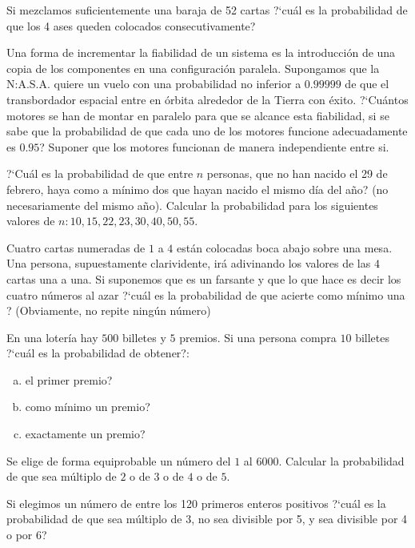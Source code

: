 \documentclass[12pt]{article}
\begin{document}
\probl  Si mezclamos   suficientemente una baraja de 52 cartas ?`cuál es la probabilidad
de que los 4 ases queden colocados consecutivamente? 

\probl  Una forma de incrementar la  fiabilidad de un sistema es la introducción de una
copia de los componentes en una configuración paralela. Supongamos  que la N:A.S.A.
quiere un vuelo  con una probabilidad no inferior a $0.99999$ de  que el transbordador
espacial entre en órbita alrededor de la Tierra con éxito. ?`Cuántos   motores se han de
montar en  paralelo para que se  alcance esta fiabilidad, si se sabe que la probabilidad
de que cada uno de los motores funcione adecuadamente es $0.95$? Suponer que los motores
funcionan de manera independiente entre si. 

\probl  ?`Cuál es la probabilidad de  que  entre
 $n$ personas, que no han nacido el 29 de
febrero,  haya  como a mínimo dos que hayan nacido el mismo día del año? (no
necesariamente del mismo año). Calcular la probabilidad para los siguientes valores de
$n: 10, 15, 22, 23, 30, 40, 50, 55$. 

\probl  Cuatro cartas numeradas de $1$ a $4$ están colocadas  boca abajo sobre una  mesa.
Una persona, supuestamente clarividente, irá adivinando  los valores de las $4$ cartas
una a una. Si suponemos que es un farsante y que lo que hace  es decir los cuatro números
al azar ?`cuál es la probabilidad de   que acierte como mínimo una ? (Obviamente, no
repite ningún número) 

\probl  En una lotería hay $500$ billetes y $5$ premios. Si una persona compra $10$
billetes ?`cuál es la probabilidad de obtener?:
\begin{enumerate}[a)]
\item el primer premio?
\item como  mínimo un premio?
\item exactamente un premio?
\end{enumerate} 

\probl  Se elige de forma equiprobable un número del $1$ al
$6000$. Calcular la probabilidad de que sea múltiplo de $2$ o de
$3$ o de $4$ o de $5$. 


\probl  Si elegimos un número de entre los 120 primeros enteros
  positivos  ?`cuál es la probabilidad de  que  sea
múltiplo de $3$, no sea divisible por 5, y sea divisible por 4 o
por 6? 
\end{document}
